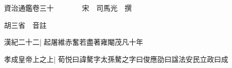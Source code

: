 






























































資治通鑑卷三十　　　　宋　司馬光　撰

胡三省　音註

漢紀二十二|{
	起屠維赤奮若盡著雍閹茂凡十年}


孝成皇帝上之上|{
	荀悦曰諱驁字太孫驁之字曰俊應劭曰諡法安民立政曰成}


